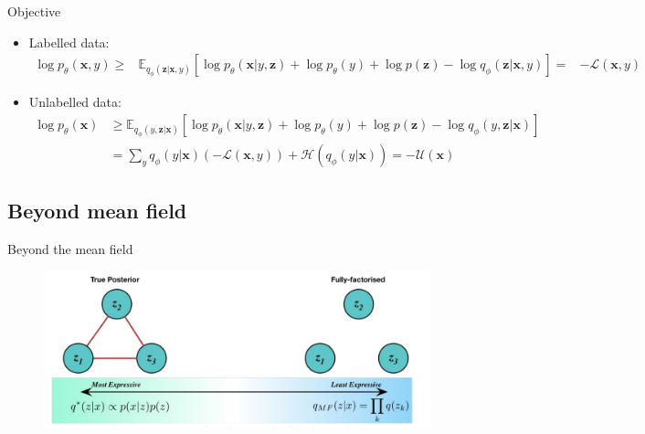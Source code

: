\begin{frame}{Objective}

\begin{itemize}

\item Labelled data: \\
\begin{equation}
\begin{aligned}
\log p_{\theta}(\mathbf{x}, y) \geq & \mathbb{E}_{q_{\phi}(\mathbf{z} | \mathbf{x}, y)}\left[\log p_{\theta}(\mathbf{x} | y, \mathbf{z})+\log p_{\theta}(y)+\log p(\mathbf{z})-\log q_{\phi}(\mathbf{z} | \mathbf{x}, y)\right]
= & -\mathcal{L}(\mathbf{x}, y)
\end{aligned}
\end{equation}
\item Unlabelled data: \\
\begin{equation}
\begin{aligned} 
\log p_{\theta}(\mathbf{x}) & \geq \mathbb{E}_{q_{\phi}(y, \mathbf{z} | \mathbf{x})}\left[\log p_{\theta}(\mathbf{x} | y, \mathbf{z})+\log p_{\theta}(y)+\log p(\mathbf{z})-\log q_{\phi}(y, \mathbf{z} | \mathbf{x})\right] \\ 
&=\sum_{y} q_{\phi}(y | \mathbf{x})(-\mathcal{L}(\mathbf{x}, y))+\mathcal{H}\left(q_{\phi}(y | \mathbf{x})\right)=-\mathcal{U}(\mathbf{x})
\end{aligned}
\end{equation}
\end{itemize}

\end{frame}


\subsection{Beyond mean field}

\begin{frame}{Beyond the mean field}
\begin{figure}
\includegraphics[scale=0.25]{struct2meanfield}
\end{figure}
\end{frame}

